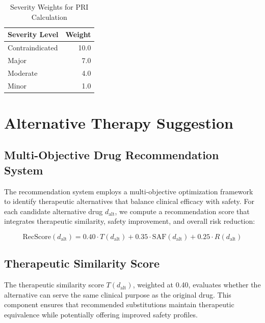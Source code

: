 \documentclass[11pt,a4paper]{article}
\begin{document}
\begin{table}[H]
\centering
\caption{Severity Weights for PRI Calculation}
\label{tab:severity_weights}
\begin{tabular}{lr}
\toprule
\textbf{Severity Level} & \textbf{Weight} \\
\midrule
Contraindicated & 10.0 \\
Major & 7.0 \\
Moderate & 4.0 \\
Minor & 1.0 \\
\bottomrule
\end{tabular}
\end{table}

\section{Alternative Therapy Suggestion}

\subsection{Multi-Objective Drug Recommendation System}

The recommendation system employs a multi-objective optimization framework to identify therapeutic alternatives that balance clinical efficacy with safety. For each candidate alternative drug $d_{\text{alt}}$, we compute a recommendation score that integrates therapeutic similarity, safety improvement, and overall risk reduction:

\begin{equation}
\text{RecScore}(d_{\text{alt}}) = 0.40 \cdot T(d_{\text{alt}}) + 0.35 \cdot \text{SAF}(d_{\text{alt}}) + 0.25 \cdot R(d_{\text{alt}})
\label{eq:recscore}
\end{equation}

\subsection{Therapeutic Similarity Score}

The therapeutic similarity score $T(d_{\text{alt}})$, weighted at 0.40, evaluates whether the alternative can serve the same clinical purpose as the original drug. This component ensures that recommended substitutions maintain therapeutic equivalence while potentially offering improved safety profiles.
\end{document}

